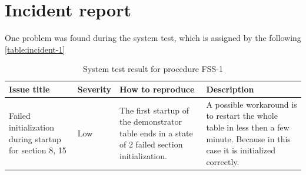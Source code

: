 \section{Incident report}
One problem was found during the system test, which is assigned by the following \autoref{table:incident-1}
\begin{table}[H]
	\caption{System test result for procedure FSS-1}
	\label{table:incident-1}
	\begin{center}
		\renewcommand{\arraystretch}{1.8}
		\begin{tabu} 
			to 0.9 \textwidth
			{ X[c] X[c] X[c] X[c] }
			\toprule
			Issue title                                            & Severity & How to reproduce                                                                                & Description                                                                                                                      \\ \midrule
			Failed initialization during startup for section 8, 15 & Low      & The first startup of the demonstrator table ends in a state of 2 failed section initialization. & A possible workaround is to restart the whole table in less then a few minute. Because in this case it is initialized correctly. \\ \bottomrule
		\end{tabu}
	\end{center}
\end{table}

